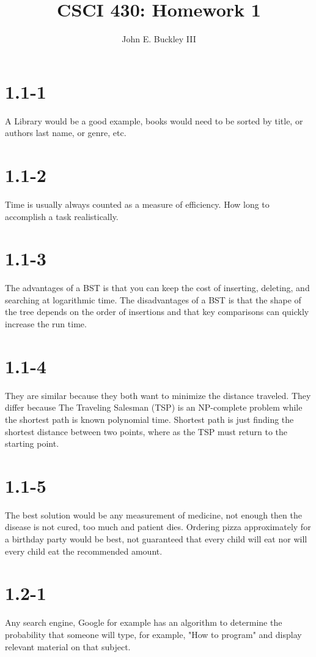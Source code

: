 \documentclass[12pt]{article}
\author{John E. Buckley III}
\title{CSCI 430: Homework 1}
\begin{document}
\maketitle

\section{1.1-1}
A Library would be a good example, books would need to be sorted by title, or authors last name, or genre, etc.

\section{1.1-2}
Time is usually always counted as a measure of efficiency. How long to accomplish a task realistically.

\section{1.1-3}
The advantages of a BST is that you can keep the cost of inserting, deleting, and searching at logarithmic time.
The disadvantages of a BST is that the shape of the tree depends on the order of insertions and that key comparisons can quickly increase the run time.
    
\section{1.1-4}
They are similar because they both want to minimize the distance traveled. 
They differ because The Traveling Salesman (TSP) is an NP-complete problem while the shortest path is known polynomial time. Shortest path is just finding the shortest distance between two points, where as the TSP  must return to the starting point.

\section{1.1-5}
The best solution would be any measurement of medicine, not enough then the disease is not cured, too much and patient dies.
Ordering pizza approximately for a birthday party would be best, not guaranteed that every child will eat nor will every child eat the recommended amount.

\section{1.2-1}
Any search engine, Google for example has an algorithm to determine the probability that someone will type, for example, "How to program" and display relevant material on that subject. 
\end{document}
